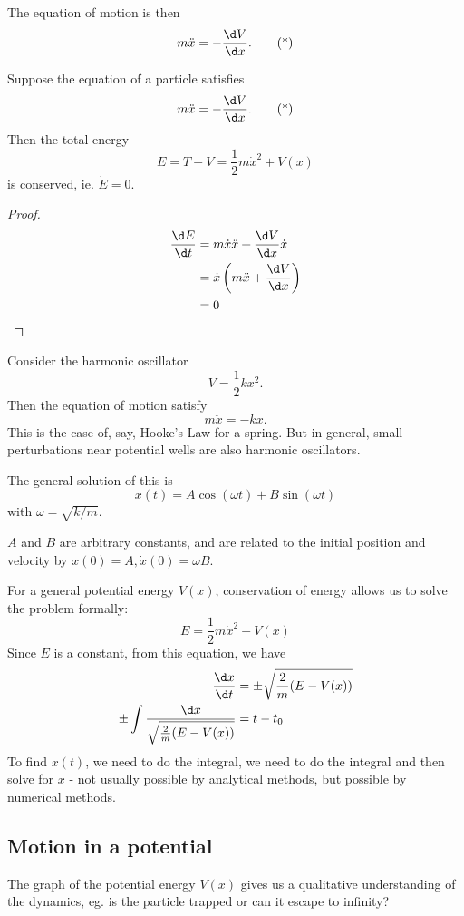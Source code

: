 \documentclass[a4paper]{article}
\begin{document}
The equation of motion is then
\[
  m\ddot{x} = -\frac{\d V}{\d x}.\tag{*}
\]

\begin{prop}
  Suppose the equation of a particle satisfies
  \[
    m\ddot{x} = -\frac{\d V}{\d x}.\tag{*}
  \]
  Then the total energy
  \[
    E = T + V = \frac{1}{2} m\dot{x}^2 + V(x)
  \]
  is conserved, ie. $\dot{E} = 0$.
\end{prop}

\begin{proof}
  \begin{align*}
    \frac{\d E}{\d t} &= m\dot{x}\ddot{x} + \frac{\d V}{\d x}\dot{x}\\
    &= \dot{x}\left(m\ddot{x} + \frac{\d V}{\d x}\right)\\
    &= 0
  \end{align*}
\end{proof}

\begin{eg}
  Consider the harmonic oscillator
  \[
    V = \frac{1}{2} kx^2.
  \]
  Then the equation of motion satisfy
  \[
    m\ddot{x} = -kx.
  \]
  This is the case of, say, Hooke's Law for a spring. But in general, small perturbations near potential wells are also harmonic oscillators.

  The general solution of this is
  \[
    x(t) = A\cos (\omega t) + B\sin (\omega t)
  \]
  with $\omega = \sqrt{k/m}$.

  $A$ and $B$ are arbitrary constants, and are related to the initial position and velocity by $x(0) = A, \dot{x}(0) = \omega B$.
\end{eg}

For a general potential energy $V(x)$, conservation of energy allows us to solve the problem formally:
\[
  E = \frac{1}{2}m\dot{x}^2 + V(x)
\]
Since $E$ is a constant, from this equation, we have
\begin{align*}
  \frac{\d x}{\d t} &= \pm \sqrt{\frac{2}{m}(E - V(x))}\\
  \pm \int \frac{\d x}{\sqrt{\frac{2}{m}(E - V(x))}} &= t - t_0
\end{align*}
To find $x(t)$, we need to do the integral, we need to do the integral and then solve for $x$ - not usually possible by analytical methods, but possible by numerical methods.

\subsection{Motion in a potential}
The graph of the potential energy $V(x)$ gives us a qualitative understanding of the dynamics, eg. is the particle trapped or can it escape to infinity?
\end{document}
